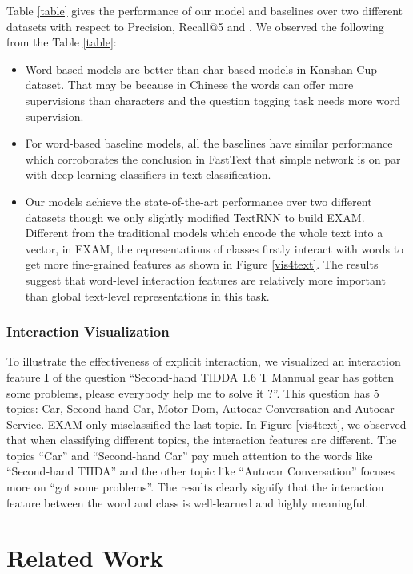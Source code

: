 \documentclass[letterpaper]{article} \usepackage{aaai19}  \usepackage{times}  \usepackage{helvet}  \usepackage{courier}  \usepackage{url}  \usepackage{graphicx}
\begin{document}
Table \ref{table} gives the performance of our model and baselines over two different datasets with respect to Precision, Recall@5 and . We observed the following from the Table \ref{table}:
\begin{itemize}
\item Word-based models are better than char-based models in Kanshan-Cup dataset. That may be because in Chinese the words can offer more supervisions than characters and the question tagging task needs more word supervision.
\item  For word-based baseline models, all the baselines have similar performance which corroborates the conclusion in FastText \cite{fasttext} that simple network is on par with deep learning classifiers in text classification.
\item Our models achieve the state-of-the-art performance over two different datasets though we only slightly modified TextRNN to build EXAM. Different from the traditional models which encode the whole text into a vector, in EXAM, the representations of classes firstly interact with  words to get more fine-grained features as shown in Figure \ref{vis4text}. The results suggest that word-level interaction features are relatively more important than global text-level representations in this task.
\end{itemize}


\subsubsection{Interaction Visualization}
To illustrate the effectiveness of explicit interaction, we visualized an interaction feature \textbf{I} of the question ``Second-hand TIDDA 1.6 T Mannual gear has gotten some problems, please everybody help me to solve it ?''. This question has 5 topics: Car, Second-hand Car, Motor Dom, Autocar Conversation and Autocar Service. EXAM only misclassified the last topic. In  Figure \ref{vis4text}, we observed that  when classifying different topics, the interaction features are different. The topics ``Car'' and ``Second-hand Car'' pay much attention to the words like ``Second-hand TIIDA'' and the other topic like ``Autocar Conversation'' focuses more on  ``got some problems''. The results clearly signify that the interaction feature between the word and class is well-learned and highly meaningful.

\section{Related Work}
\end{document}
